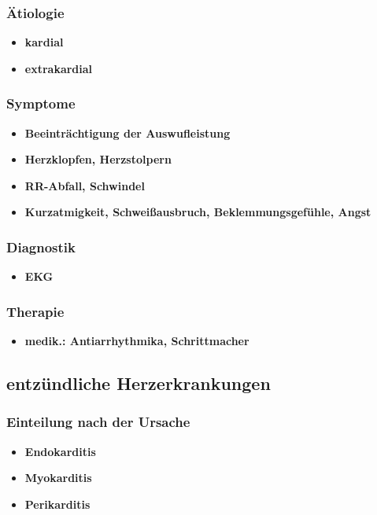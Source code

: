		\subsubsection{Ätiologie}
			\begin{itemize}
				\item \textbf{kardial}
				\item \textbf{extrakardial}
			\end{itemize}
		\subsubsection{Symptome}
			\begin{itemize}
				\item \textbf{Beeinträchtigung der Auswufleistung}
				\item \textbf{Herzklopfen, Herzstolpern}
				\item \textbf{RR-Abfall, Schwindel}
				\item \textbf{Kurzatmigkeit, Schweißausbruch, Beklemmungsgefühle, Angst}
			\end{itemize}
		\subsubsection{Diagnostik}
			\begin{itemize}
				\item \textbf{EKG}
			\end{itemize}
		\subsubsection{Therapie}
			\begin{itemize}
				\item \textbf{medik.: Antiarrhythmika, Schrittmacher}
			\end{itemize}
	\subsection{entzündliche Herzerkrankungen}
		\subsubsection{Einteilung nach der Ursache}
			\begin{itemize}
				\item \textbf{Endokarditis}
				\item \textbf{Myokarditis}
				\item \textbf{Perikarditis}
			\end{itemize}
